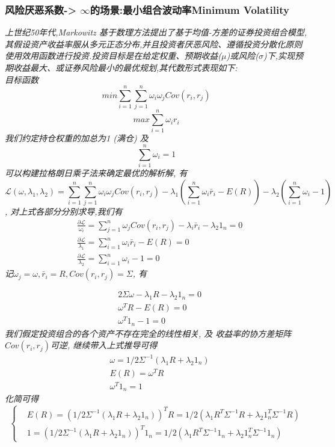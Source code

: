 \documentclass{scrartcl}
\numberwithin{equation}{section}
\begin{document}
\subsubsection{风险厌恶系数-> $\infty$的场景:最小组合波动率Minimum Volatility}
\textsl{
    上世纪50年代,Markowitz 基于数理方法提出了基于均值-方差的证券投资组合模型,其假设资产收益率服从多元正态分布,并且投资者厌恶风险、遵循投资分散化原则使用效用函数进行投资.投资目标是在给定权重、预期收益($\mu$)或风险($\sigma$)下,实现预期收益最大、或证券风险最小的最优规划,其代数形式表现如下:\\
    目标函数  $$ min \sum_{i=1}^n \sum_{j=1}^n \omega_i \omega_j Cov(r_i, r_j)$$ $$ max  \sum_{i=1}^n \omega_i r_i$$
    我们约定持仓权重的加总为1 (满仓) 及 $$\sum_{i=1}^n \omega_i =1 $$ 可以构建拉格朗日乘子法来确定最优的解析解, 有 $$\mathcal{L} (\omega, \lambda_1, \lambda_2) = \sum_{i=1}^n \sum_{j=1}^n \omega_i \omega_j Cov(r_i, r_j) - \lambda_1(\sum_{i=1}^n \omega_i \bar{r}_i - E(R)) - \lambda_2 (\sum_{i=1}^n \omega_i -1) $$, 对上式各部分分别求导,我们有}
\begin{equation}
    \begin{aligned}
         & \frac{\partial \mathcal{L}}{\omega_i} = \sum_{j=1}^n \omega_j Cov(r_i, r_j) - \lambda_i \bar{r}_i - \lambda_2 1_n =0 \\ & \frac{\partial \mathcal{L}}{\lambda_1} = \sum_{i=1}^n \omega_i \bar{r}_i - E(R) =0 \\ & \frac{\partial \mathcal{L}}{\lambda_2} = \sum_{i=1}^n \omega_i -1 =0
    \end{aligned}
\end{equation}
\textsl{
    记$\omega_j = \omega, \bar{r}_i =R,  Cov(r_i, r_j) = \Sigma $, 有}

\begin{equation}
    \begin{aligned}
         & 2 \Sigma \omega  - \lambda_1 R - \lambda_2 1_n =0 \\ & \omega^T R - E(R) = 0 \\ & \omega^T  1_n  -1 = 0
    \end{aligned}
\end{equation}
\textsl{我们假定投资组合的各个资产不存在完全的线性相关, 及 收益率的协方差矩阵$Cov(r_i, r_j)$可逆, 继续带入上式推导可得}
\begin{equation}
    \begin{aligned}
         & \omega = 1/2 \Sigma^{-1}(\lambda_1 R +\lambda_2 1_n) \\ & E(R) = \omega^T R \\ & \omega^T  1_n = 1
    \end{aligned}
\end{equation}
\textsl{
    化简可得
}
\begin{equation}
    \left\{
    \begin{array}{lr}
         & E(R) = (1/2 \Sigma^{-1}(\lambda_1 R +\lambda_2 1_n))^T R = 1/2(\lambda_1 R^T \Sigma^{-1} R + \lambda_2 1_n^T \Sigma^{-1} R) \\ & 1 = (1/2 \Sigma^{-1}(\lambda_1 R +\lambda_2 1_n))^T  1_n  = 1/2(\lambda_1 R^T \Sigma^{-1} 1_n + \lambda_2 1_n^T \Sigma^{-1} 1_n)
    \end{array}
    \right.
\end{equation}
\end{document}
